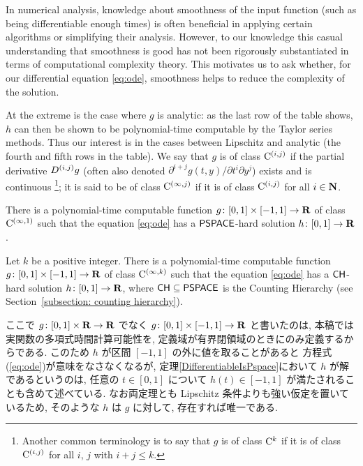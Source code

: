 In numerical analysis, 
knowledge about smoothness of the input function 
(such as being differentiable enough times) 
is often beneficial 
in applying certain algorithms or simplifying their analysis.
However, to our knowledge
this casual understanding that smoothness is good 
has not been 
rigorously substantiated in terms of 
computational complexity theory. 
This motivates us to ask whether, 
for our differential equation \eqref{eq:ode}, 
smoothness helps to reduce the complexity of the solution. 

At the extreme is the case where $g$ is analytic: 
as the last row of the table shows, 
$h$ can then be shown to be polynomial-time computable 
by the Taylor series methods. 
Thus our interest is in 
the cases between Lipschitz and analytic 
(the fourth and fifth rows in the table). 
We say that $g$ is of class $\mathrm C ^{(i, j)}$
if the partial derivative $D ^{(i, j)} g$ 
(often also denoted $\partial ^{i + j} g (t, y) / \partial t ^i \partial y ^j$)
exists and is continuous%
\footnote{%
Another common terminology is to say that $g$ is of class $\mathrm C ^k$
if it is of class $\mathrm C ^{(i,j)}$ 
for all $i$, $j$ with $i + j \leq k$.}; 
it is said to be of class $\mathrm C ^{(\infty, j)}$ if
it is of class $\mathrm C ^{(i, j)}$ for all $i \in \mathbf N$. 

\begin{theorem}
 \label{DifferentiableIsPspace}
There is a polynomial-time computable function
$g \colon [0,1] \times [-1,1] \to \mathbf R$ 
of class $\mathrm C ^{(\infty, 1)}$ such that
the equation \eqref{eq:ode} has a 
$\mathsf{PSPACE}$-hard solution $h \colon [0, 1] \to \mathbf R$. 
 \end{theorem}

 \begin{theorem}
  \label{KTimesIsCH}
Let $k$ be a positive integer. 
There is a polynomial-time computable function
$g \colon [0,1] \times [-1,1] \to \mathbf R$ 
of class $\mathrm C ^{(\infty, k)}$ such that
the equation \eqref{eq:ode} has a 
$\mathsf{CH}$-hard solution $h \colon [0, 1] \to \mathbf R$, 
where $\mathsf{CH} \subseteq \mathsf{PSPACE}$ is the 
Counting Hierarchy (see Section~\ref{subsection: counting hierarchy}). 
 \end{theorem}

ここで $g \colon [0,1] \times \mathbf R \to \mathbf R$ でなく
$g \colon [0,1] \times [-1, 1] \to \mathbf R$ と書いたのは, 
本稿では実関数の多項式時間計算可能性を, 
定義域が有界閉領域のときにのみ定義するからである. 
このため $h$ が区間 $[-1, 1]$ の外に値を取ることがあると
方程式(\ref{eq:ode})が意味をなさなくなるが, 
定理\ref{DifferentiableIsPspace}において $h$ が解であるというのは, 
任意の $t \in [0, 1]$ について $h (t) \in [-1, 1]$ が満たされることも含めて述べている.
なお両定理とも Lipschitz 条件よりも強い仮定を置いているため, 
そのような $h$ は $g$ に対して, 存在すれば唯一である. 

